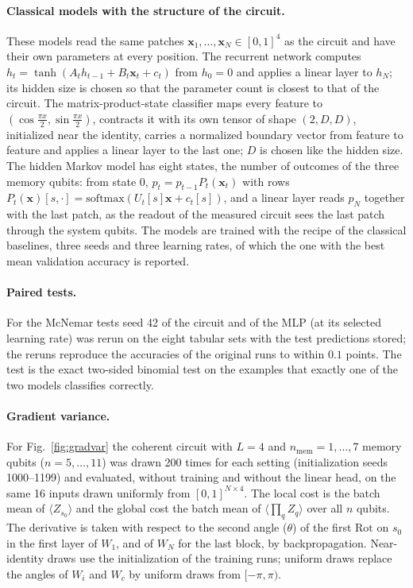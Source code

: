 \documentclass[11pt]{article}
\begin{document}
\paragraph{Classical models with the structure of the circuit.}
These models read the same patches $\mathbf{x}_1,\dots,\mathbf{x}_N\in[0,1]^4$ as the circuit and have their own parameters at every position. The recurrent network computes $h_t=\tanh(A_th_{t-1}+B_t\mathbf{x}_t+c_t)$ from $h_0=0$ and applies a linear layer to $h_N$; its hidden size is chosen so that the parameter count is closest to that of the circuit. The matrix-product-state classifier maps every feature to $(\cos\frac{\pi x}{2},\sin\frac{\pi x}{2})$, contracts it with its own tensor of shape $(2,D,D)$, initialized near the identity, carries a normalized boundary vector from feature to feature and applies a linear layer to the last one; $D$ is chosen like the hidden size. The hidden Markov model has eight states, the number of outcomes of the three memory qubits: from state $0$, $p_t=p_{t-1}P_t(\mathbf{x}_t)$ with rows $P_t(\mathbf{x})[s,\cdot]=\mathrm{softmax}(U_t[s]\mathbf{x}+c_t[s])$, and a linear layer reads $p_N$ together with the last patch, as the readout of the measured circuit sees the last patch through the system qubits. The models are trained with the recipe of the classical baselines, three seeds and three learning rates, of which the one with the best mean validation accuracy is reported.

\paragraph{Paired tests.}
For the McNemar tests seed 42 of the circuit and of the MLP (at its selected learning rate) was rerun on the eight tabular sets with the test predictions stored; the reruns reproduce the accuracies of the original runs to within $0.1$ points. The test is the exact two-sided binomial test on the examples that exactly one of the two models classifies correctly.

\paragraph{Gradient variance.}
For Fig.~\ref{fig:gradvar} the coherent circuit with $L=4$ and $n_\mathrm{mem}=1,\dots,7$ memory qubits ($n=5,\dots,11$) was drawn 200 times for each setting (initialization seeds 1000--1199) and evaluated, without training and without the linear head, on the same 16 inputs drawn uniformly from $[0,1]^{N\times4}$. The local cost is the batch mean of $\langle Z_{s_0}\rangle$ and the global cost the batch mean of $\langle\prod_qZ_q\rangle$ over all $n$ qubits. The derivative is taken with respect to the second angle ($\theta$) of the first $\mathrm{Rot}$ on $s_0$ in the first layer of $W_1$, and of $W_N$ for the last block, by backpropagation. Near-identity draws use the initialization of the training runs; uniform draws replace the angles of $W_i$ and $W_c$ by uniform draws from $[-\pi,\pi)$.
\end{document}
